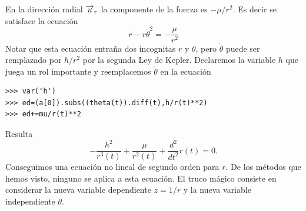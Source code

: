 En la dirección radial $\overrightarrow{u}_r$ la componente de la fuerza es $-\mu/r^2$. Es decir se satisface la ecuación
\[
\ddot{r}-r\dot{\theta}^2=-\frac{\mu}{r^2}
\]
Notar que esta ecuación entraña dos incognitas $r$ y $\theta$, pero $\dot{\theta}$ puede ser remplazado por $h/r^2$ por la segunda Ley de Kepler.
Declaremos la variable $h$ que juega un rol importante y reemplacemos $\dot{\theta}$ en la ecuación

\begin{lstlisting}
>>> var('h')
>>> ed=(a[0]).subs((theta(t)).diff(t),h/r(t)**2)
>>> ed+=mu/r(t)**2
\end{lstlisting}
Resulta
\[- \frac{h^{2}}{r^{3}{\left (t \right )}} + \frac{\mu}{r^{2}{\left (t \right )}} + \frac{d^{2}}{d t^{2}}  r{\left (t \right )}=0.
\]
Conseguimos una ecuación no lineal de segundo orden para $r$. De los métodos que hemos visto, ninguno se aplica a esta ecuación.
El truco mágico consiste en considerar la nueva variable dependiente $z=1/r$ y la nueva variable independiente
$\theta$.

